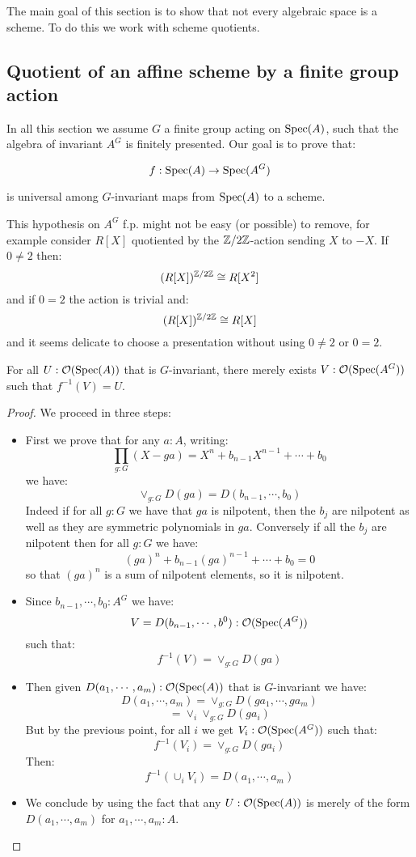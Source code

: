 The main goal of this section is to show that not every algebraic space is a scheme. To do this we work with scheme quotients.

\subsection{Quotient of an affine scheme by a finite group action}

In all this section we assume $G$ a finite group acting on $\operatorname{Spec}(A)$, such that the algebra of invariant $A^G$ is finitely presented. Our goal is to prove that:

\[f:\operatorname{Spec}(A)\to \operatorname{Spec}(A^G)\] 

is universal among $G$-invariant maps from $\operatorname{Spec}(A)$ to a scheme.

\begin{remark}
This hypothesis on $A^G$ f.p. might not be easy (or possible) to remove, for example consider $R[X]$ quotiented by the $\mathbb{Z}/2\mathbb{Z}$-action sending $X$ to $-X$. If $0\not=2$ then:
\[(R[X])^{\mathbb{Z}/2\mathbb{Z}} \cong R[X^2]\]
and if $0=2$ the action is trivial and:
\[(R[X])^{\mathbb{Z}/2\mathbb{Z}} \cong R[X]\]
and it seems delicate to choose a presentation without using  $0\not=2$ or $0=2$.
\end{remark}

\begin{lemma}\label{surjective-on-open}
For all $U: \mathcal{O}(\operatorname{Spec}(A))$ that is $G$-invariant, there merely exists $V:\mathcal{O}(\operatorname{Spec}(A^G))$ such that $f^{-1}(V)=U$.
\end{lemma}

\begin{proof}
We proceed in three steps:
\begin{itemize}
\item First we prove that for any $a:A$, writing:
\[\prod_{g:G}(X-ga) = X^n + b_{n-1}X^{n-1} + \cdots + b_0\]
we have:
\[ \lor_{g:G} D(ga) = D(b_{n-1},\cdots,b_0)\]
Indeed if for all $g:G$ we have that $ga$ is nilpotent, then the $b_j$ are nilpotent as well as they are symmetric polynomials in $ga$. Conversely if all the $b_j$ are nilpotent then for all $g:G$ we have:
\[(ga)^n + b_{n-1}(ga)^{n-1} + \cdots + b_0 = 0\]
so that $(ga)^n$ is a sum of nilpotent elements, so it is nilpotent.

\item Since $b_{n-1},\cdots,b_0:A^G$ we have:
\[V = D(b_{n-1},\cdots,b^0):\mathcal{O}(\operatorname{Spec}(A^G))\]
such that:
\[f^{-1}(V) = \lor_{g:G} D(ga)\]

\item Then given $D(a_1,\cdots,a_m):\mathcal{O}(\operatorname{Spec}(A))$ that is $G$-invariant we have:
\[D(a_1,\cdots,a_m) = \lor_{g:G}D(ga_1,\cdots,ga_m)\]
\[= \lor_i\lor_{g:G}D(ga_i)\]
But by the previous point, for all $i$ we get $V_i:\mathcal{O}(\operatorname{Spec}(A^G))$ such that:
\[f^{-1}(V_i) = \lor_{g:G}D(ga_i)\]
Then:
\[f^{-1}(\cup_iV_i) = D(a_1,\cdots,a_m)\]

\item We conclude by using the fact that any $U:\mathcal{O}(\operatorname{Spec}(A))$ is merely of the form $D(a_1,\cdots,a_m)$ for $a_1,\cdots,a_m:A$.

\end{itemize}
\end{proof}

